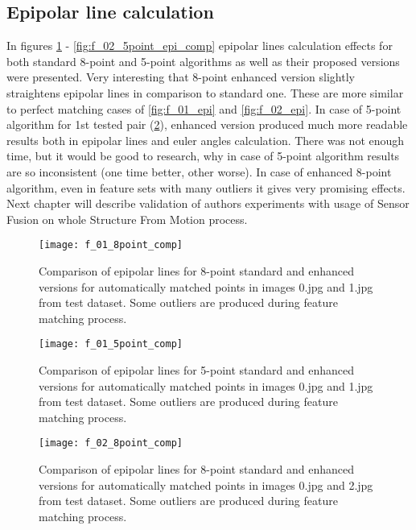 \subsection{Epipolar line calculation}
In figures \ref{fig:f_01_8point_epi_comp} - \ref{fig:f_02_5point_epi_comp} epipolar lines calculation effects for both standard 8-point and 5-point algorithms as well as their proposed versions were presented. Very interesting that 8-point enhanced version slightly straightens epipolar lines in comparison to standard one. These are more similar to perfect matching cases of \ref{fig:f_01_epi} and \ref{fig:f_02_epi}. In case of 5-point algorithm for 1st tested pair (\ref{fig:f_01_5point_comp}), enhanced version produced much more readable results both in epipolar lines and euler angles calculation. There was not enough time, but it would be good to research, why in case of 5-point algorithm results are so inconsistent (one time better, other worse). In case of enhanced 8-point algorithm, even in feature sets with many outliers it gives very promising effects. Next chapter will describe validation of authors experiments with usage of Sensor Fusion on whole Structure From Motion process.
\begin{figure}[h!]
    \centering
    \texttt{[image: f\_01\_8point\_comp]}
    \caption[Comparison of epipolar lines for 8-point standard and enhanced versions  - 1st example]{Comparison of epipolar lines for 8-point standard and enhanced versions for automatically matched points in images 0.jpg and 1.jpg from test dataset. Some outliers are produced during feature matching process.}
    \label{fig:f_01_8point_epi_comp}
\end{figure}

\begin{figure}[h!]
    \centering
    \texttt{[image: f\_01\_5point\_comp]}
    \caption[Comparison of epipolar lines for 5-point standard and enhanced versions  - 1st example]{Comparison of epipolar lines for 5-point standard and enhanced versions for automatically matched points in images 0.jpg and 1.jpg from test dataset. Some outliers are produced during feature matching process.}
    \label{fig:f_01_5point_comp}
\end{figure}

\begin{figure}[h!]
    \centering
    \texttt{[image: f\_02\_8point\_comp]}
    \caption[Comparison of epipolar lines for 8-point standard and enhanced versions  - 2nd example]{Comparison of epipolar lines for 8-point standard and enhanced versions for automatically matched points in images 0.jpg and 2.jpg from test dataset. Some outliers are produced during feature matching process.}
    \label{fig:f_02_8point_epi_comp}
\end{figure}

